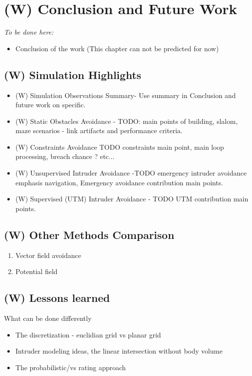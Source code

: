 \chapter{(W) Conclusion and Future Work}\label{ch:Conclusion}
    \emph{To be done here:}
    \begin{itemize}
        \item Conclusion of the work (This chapter can not be predicted for now)
    \end{itemize}

\section{(W) Simulation Highlights}\label{s:simulationHighlights}
\begin{itemize}
	\item {(W) Simulation Observations Summary}- Use summary in Conclusion and future work on specific.
	
	\item{(W) Static Obstacles Avoidance} - \noindent TODO: main points of building, slalom, maze scenarios - link artifacts and performance criteria.
	
	\item{(W) Constraints Avoidance} TODO constraints main point, main loop processing, breach chance ? etc...	

	\item{(W) Unsupervised Intruder Avoidance} -TODO emergency intruder avoidance emphasis navigation, Emergency avoidance contribution main points.
	
	\item{(W) Supervised (UTM) Intruder Avoidance} - TODO UTM contribution main points.
\end{itemize} 
    
\section{(W) Other Methods Comparison}\label{s:OtherMethodsComparison}

\begin{enumerate}
	\item Vector field avoidance \cite{borenstein1991vector}
	\item Potential field \cite{koren1991potential}
\end{enumerate}

\section{(W) Lessons learned}
What can be done differently
\begin{itemize}
	\item The discretization - euclidian grid vs planar grid
	\item Intruder modeling ideas, the linear intersection without body volume
	\item The probabilistic/vs rating approach
\end{itemize}





    


